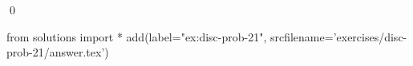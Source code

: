 
\begin{ex} 
  \label{ex:disc-prob-21}
  
  \qed
\end{ex} 
\begin{python0}
from solutions import *
add(label="ex:disc-prob-21",
    srcfilename='exercises/disc-prob-21/answer.tex') 
\end{python0}
